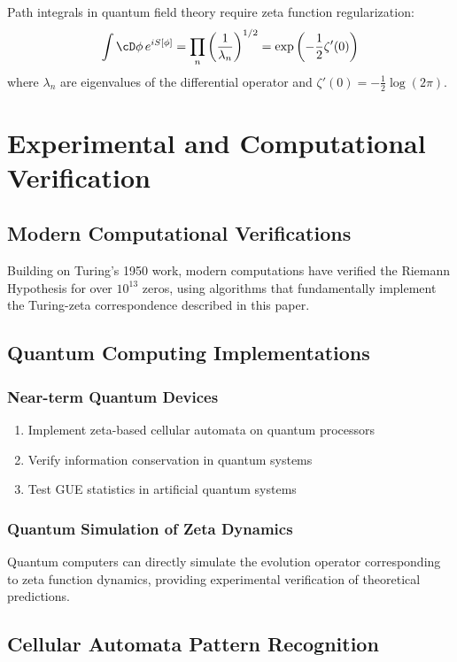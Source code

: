 \documentclass[12pt]{article}
\theoremstyle{plain}
\theoremstyle{definition}
\begin{document}
Path integrals in quantum field theory require zeta function regularization:
$$\int \cD\phi \, e^{iS[\phi]} = \prod_{n} \left(\frac{1}{\lambda_n}\right)^{1/2} = \exp\left(-\frac{1}{2}\zeta'(0)\right)$$
where $\lambda_n$ are eigenvalues of the differential operator and $\zeta'(0) = -\frac{1}{2}\log(2\pi)$.

\section{Experimental and Computational Verification}

\subsection{Modern Computational Verifications}

Building on Turing's 1950 work, modern computations have verified the Riemann Hypothesis for over $10^{13}$ zeros, using algorithms that fundamentally implement the Turing-zeta correspondence described in this paper.

\subsection{Quantum Computing Implementations}

\subsubsection{Near-term Quantum Devices}

\begin{enumerate}
\item Implement zeta-based cellular automata on quantum processors
\item Verify information conservation in quantum systems
\item Test GUE statistics in artificial quantum systems
\end{enumerate}

\subsubsection{Quantum Simulation of Zeta Dynamics}

Quantum computers can directly simulate the evolution operator corresponding to zeta function dynamics, providing experimental verification of theoretical predictions.

\subsection{Cellular Automata Pattern Recognition}
\end{document}
